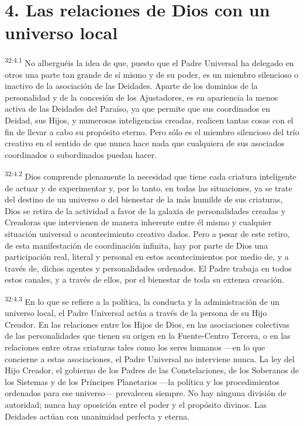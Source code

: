 \section*{4. Las relaciones de Dios con un universo local}
\par
\textsuperscript{32:4.1} No alberguéis la idea de que, puesto que el Padre Universal ha delegado en otros una parte tan grande de sí mismo y de su poder, es un miembro silencioso o inactivo de la asociación de las Deidades. Aparte de los dominios de la personalidad y de la concesión de los Ajustadores, es en apariencia la menos activa de las Deidades del Paraíso, ya que permite que sus coordinados en Deidad, sus Hijos, y numerosas inteligencias creadas, realicen tantas cosas con el fin de llevar a cabo su propósito eterno. Pero sólo es el miembro silencioso del trío creativo en el sentido de que nunca hace nada que cualquiera de sus asociados coordinados o subordinados puedan hacer.

\par
\textsuperscript{32:4.2} Dios comprende plenamente la necesidad que tiene cada criatura inteligente de actuar y de experimentar y, por lo tanto, en todas las situaciones, ya se trate del destino de un universo o del bienestar de la más humilde de sus criaturas, Dios se retira de la actividad a favor de la galaxia de personalidades creadas y Creadoras que intervienen de manera inherente entre él mismo y cualquier situación universal o acontecimiento creativo dados. Pero a pesar de este retiro, de esta manifestación de coordinación infinita, hay por parte de Dios una participación real, literal y personal en estos acontecimientos por medio de, y a través de, dichos agentes y personalidades ordenados. El Padre trabaja en todos estos canales, y a través de ellos, por el bienestar de toda su extensa creación.

\par
\textsuperscript{32:4.3} En lo que se refiere a la política, la conducta y la administración de un universo local, el Padre Universal actúa a través de la persona de su Hijo Creador. En las relaciones entre los Hijos de Dios, en las asociaciones colectivas de las personalidades que tienen su origen en la Fuente-Centro Tercera, o en las relaciones entre otras criaturas tales como los seres humanos ---en lo que concierne a estas asociaciones, el Padre Universal no interviene nunca. La ley del Hijo Creador, el gobierno de los Padres de las Constelaciones, de los Soberanos de los Sistemas y de los Príncipes Planetarios ---la política y los procedimientos ordenados para ese universo--- prevalecen siempre. No hay ninguna división de autoridad; nunca hay oposición entre el poder y el propósito divinos. Las Deidades actúan con unanimidad perfecta y eterna.

